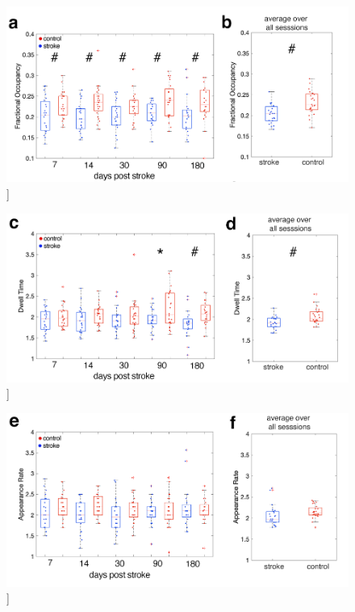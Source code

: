 \documentclass[phd,tocprelim]{cornell}
\renewcommand{\caption}[1]{\singlespacing\hangcaption{#1}\normalspacing}
\begin{document}
\null
\vfill
\clearpage
\null
\vfill
\begin{figure}[h!]
		\ContinuedFloat
		\captionsetup{labelformat=adja-page}
    \centering
    \includegraphics[width=1\textwidth]{chapter2/Figure3ab.png}
    \caption[]{}
\end{figure}
\null
\vfill
\clearpage    
    \null
\vfill
\begin{figure}[h!]
		\ContinuedFloat
		\captionsetup{labelformat=adja-page}
    \centering
    \includegraphics[width=1\textwidth]{chapter2/Figure3cd.png}
    \caption[]{}
\end{figure}
\null
\vfill
 \clearpage    
    \null
\vfill
\begin{figure}[h!]
		\ContinuedFloat
		\captionsetup{labelformat=adja-page}
    \centering
    \includegraphics[width=1\textwidth]{chapter2/Figure3ef.png}
    \caption[]{}
\end{figure}
\null
\vfill
 \clearpage    
 
\end{document}

